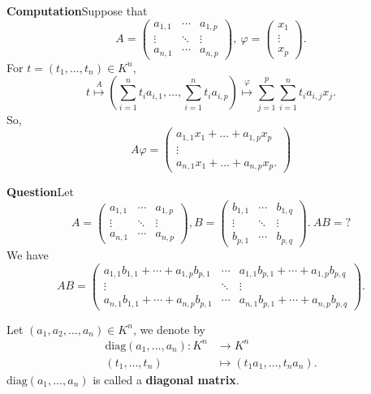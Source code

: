 \begin{box2}
\textbf{Computation}\quad Suppose that 
$$A=\begin{pmatrix}  
  a_{1,1} & \cdots & a_{1,p} \\  
  \vdots & \ddots & \vdots \\  
  a_{n,1} & \cdots & a_{n,p}  
\end{pmatrix} ,\ \varphi =\begin{pmatrix}
 x_1\\
 \vdots\\
x_p

\end{pmatrix}.$$
For $t=(t_1, \dots, t_n)\in K^n$, 
$$t\overset{A}{\longmapsto}\left(\sum_{i=1}^{n}t_ia_{i,1},\dots,\sum_{i=1}^{n}t_ia_{i,p} \right)\overset{\varphi}{\longmapsto}\sum_{j=1}^{p}\sum_{i=1}^{n}t_ia_{i,j}x_j.$$
So, 
$$A\varphi=\begin{pmatrix}
    a_{1,1}x_1+\dots+a_{1,p}x_p\\
    \vdots\\
    a_{n,1}x_1+\dots+a_{n,p}x_p.
\end{pmatrix}$$
\end{box2}
\begin{box2}
    \textbf{Question}\quad Let 
    $$A=\begin{pmatrix}  
  a_{1,1} & \cdots & a_{1,p} \\  
  \vdots & \ddots & \vdots \\  
  a_{n,1} & \cdots & a_{n,p}  
\end{pmatrix} ,B=\begin{pmatrix}  
  b_{1,1} & \cdots & b_{1,q} \\  
  \vdots & \ddots & \vdots \\  
  b_{p,1} & \cdots & b_{p,q}  
\end{pmatrix} . \ AB=? $$
    We have
    $$AB=\begin{pmatrix}  
  a_{1,1}b_{1,1}+\cdots+a_{1,p}b_{p,1} & \cdots & a_{1,1}b_{p,1}+\cdots+a_{1,p}b_{p,q} \\  
  \vdots & \ddots & \vdots \\  
  a_{n,1}b_{1,1}+\cdots+a_{n,p}b_{p,1} & \cdots & a_{n,1}b_{p,1}+\cdots+a_{n,p}b_{p,q}  
\end{pmatrix} .$$
\end{box2}
\begin{exampleenv}
    Let $(a_1,a_2,\dots,a_n)\in K^n$, we denote by 
    \begin{align*}
        \mathrm{diag}(a_1,\dots,a_n):K^n&\longrightarrow K^n\\
        (t_1,\dots,t_n)&\longmapsto(t_1a_1,\dots,t_na_n).
    \end{align*}
    $\mathrm{diag}(a_1,\dots,a_n)$ is called a \textbf{diagonal matrix}.
\end{exampleenv}
